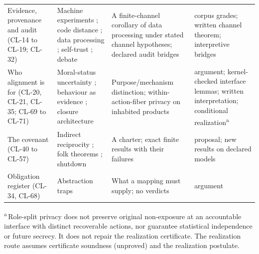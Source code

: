 \documentclass[pdflatex,sn-basic]{sn-jnl}%
\begin{document}
\begin{appendices}
\begin{table}[htbp]
\begin{tabularx}{\textwidth}{@{}>{\raggedright\arraybackslash}p{2.7cm}>{\raggedright\arraybackslash}X>{\raggedright\arraybackslash}X>{\raggedright\arraybackslash}p{3.0cm}@{}}
    Evidence, provenance and audit (CL-14 to CL-19; CL-32) & Machine experiments \citep{moore1956}; code distance \citep{hamming1950}; data processing \citep{cover2005}; self-trust \citep{yudkowsky2013tiling}; debate \citep{browncohen2024} & A finite-channel corollary of data processing under stated channel hypotheses; declared audit bridges & corpus grades; written channel theorem; interpretive bridges \\
    Who alignment is for (CL-20, CL-21, CL-35; CL-69 to CL-71) & Moral-status uncertainty \citep{schwitzgebel2015,long2024,butlin2023}; behaviour as evidence \citep{danaher2020}; closure architecture \citep{tsiokos2026consciousness} & Purpose/mechanism distinction; within-action-fiber privacy on inhabited products & argument; kernel-checked interface lemmas; written interpretation; conditional realization\textsuperscript{a} \\
    The covenant (CL-40 to CL-57) & Indirect reciprocity \citep{sugden1986,nowak1998,ohtsuki2004}; folk theorems \citep{fudenberg1986}; shutdown \citep{soares2015} & A charter; exact finite results with their failures & proposal; new results on declared models \\
    Obligation register (CL-34, CL-68) & Abstraction traps \citep{selbst2019} & What a mapping must supply; no verdicts & argument \\
    \bottomrule
  \end{tabularx}

  \smallskip
  {\footnotesize\raggedright
  \textsuperscript{a}\,Role-split privacy does not preserve original non-exposure at an accountable interface with distinct recoverable actions, nor guarantee statistical independence or future secrecy. It does not repair the realization certificate. The realization route assumes certificate soundness (unproved) and the realization postulate.\par}
\end{table}
\FloatBarrier%
\end{appendices}

\ifsnjnl\else\fi

\end{document}
